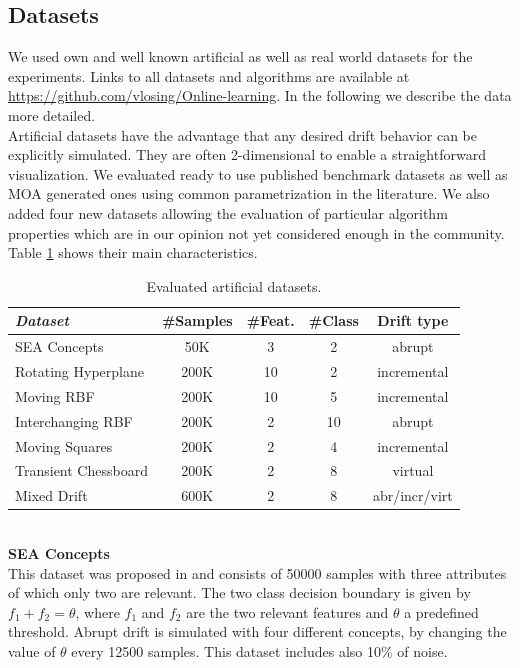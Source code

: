 \documentclass[conference]{IEEEtran}
\begin{document}
\subsection{Datasets}
We used own and well known artificial as well as real world datasets for the experiments.
Links to all datasets and algorithms are available at \url{https://github.com/vlosing/Online-learning}. 
In the following we describe the data more detailed.\\

Artificial datasets have the advantage that any desired drift behavior can be explicitly simulated. They are often 
2-dimensional to enable a straightforward visualization. We evaluated ready to use published benchmark datasets as well as MOA generated ones using common parametrization in the literature.
We also added four new datasets allowing the evaluation of particular algorithm properties which are in our opinion not yet considered enough in the community. 
Table \ref{tab:artDatasets} shows their main characteristics.
\begin{table}
\caption{Evaluated artificial datasets.}
\label{tab:artDatasets}
\centering
\begin{tabular}{l|cccc}
\textit{Dataset} & \#Samples&\#Feat.&\#Class&Drift type\\\hline
SEA Concepts & 50K & 3 & 2 & abrupt\\
Rotating Hyperplane & 200K & 10 & 2 & incremental\\
Moving RBF & 200K & 10 & 5 & incremental\\
Interchanging RBF & 200K & 2 & 10 & abrupt\\
Moving Squares & 200K & 2 & 4 & incremental\\
Transient Chessboard & 200K & 2 & 8 & virtual\\
Mixed Drift & 600K & 2 & 8 & abr/incr/virt\\
\end{tabular}
\end{table}
\\\textbf{SEA Concepts}\\
This dataset was proposed in \cite{Street:2001:SEA:502512.502568} and consists of 50000 samples with three attributes of which only two are relevant.
The two class decision boundary is given by $f_1 + f_2 = \theta$, where $f_1$ and $f_2$ are the two relevant features and $\theta$ a predefined threshold.
Abrupt drift is simulated with four different concepts, by changing the value of $\theta$ every 12500 samples.
This dataset includes also 10\% of noise.\\
\end{document}
